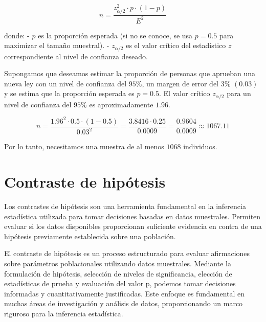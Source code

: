 \documentclass[
  letterpaper,
  DIV=11,
  numbers=noendperiod]{scrreprt}
\begin{document}
\[
n = \frac{z_{\alpha/2}^2 \cdot p \cdot (1 - p)}{E^2}
\]

donde: - \(p\) es la proporción esperada (si no se conoce, se usa
\(p = 0.5\) para maximizar el tamaño muestral). - \(z_{\alpha/2}\) es el
valor crítico del estadístico \(z\) correspondiente al nivel de
confianza deseado.

\begin{tcolorbox}[enhanced jigsaw, arc=.35mm, breakable, coltitle=black, left=2mm, opacityback=0, bottomtitle=1mm, colbacktitle=quarto-callout-tip-color!10!white, title=\textcolor{quarto-callout-tip-color}{\faLightbulb}\hspace{0.5em}{Ejemplo. Tamaño muestral para la estimación de una proporción}, titlerule=0mm, colback=white, colframe=quarto-callout-tip-color-frame, bottomrule=.15mm, rightrule=.15mm, opacitybacktitle=0.6, toptitle=1mm, toprule=.15mm, leftrule=.75mm]

Supongamos que deseamos estimar la proporción de personas que aprueban
una nueva ley con un nivel de confianza del \(95\%\), un margen de error
del \(3\%\) \((0.03)\) y se estima que la proporción esperada es
\(p = 0.5\). El valor crítico \(z_{\alpha/2}\) para un nivel de
confianza del \(95\%\) es aproximadamente \(1.96\).

\[
n = \frac{1.96^2 \cdot 0.5 \cdot (1 - 0.5)}{0.03^2} = \frac{3.8416 \cdot 0.25}{0.0009} = \frac{0.9604}{0.0009} \approx 1067.11
\]

Por lo tanto, necesitamos una muestra de al menos \(1068\) individuos.

\end{tcolorbox}

\hypertarget{contraste-de-hipuxf3tesis-1}{%
\section{Contraste de hipótesis}\label{contraste-de-hipuxf3tesis-1}}

Los contrastes de hipótesis son una herramienta fundamental en la
inferencia estadística utilizada para tomar decisiones basadas en datos
muestrales. Permiten evaluar si los datos disponibles proporcionan
suficiente evidencia en contra de una hipótesis previamente establecida
sobre una población.

El contraste de hipótesis es un proceso estructurado para evaluar
afirmaciones sobre parámetros poblacionales utilizando datos muestrales.
Mediante la formulación de hipótesis, selección de niveles de
significancia, elección de estadísticas de prueba y evaluación del valor
p, podemos tomar decisiones informadas y cuantitativamente justificadas.
Este enfoque es fundamental en muchas áreas de investigación y análisis
de datos, proporcionando un marco riguroso para la inferencia
estadística.
\end{document}
